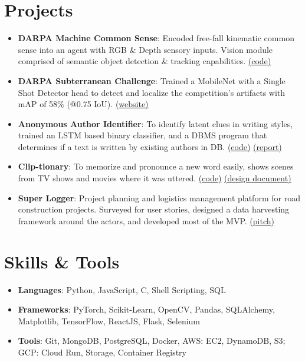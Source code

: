 \documentclass[letterpaper,11pt]{article}
\newcommand{\resumeItem}[2]{
  \item\small{
    \textbf{#1}{: #2 \vspace{-2pt}}
  }
}
\newcommand{\resumeSubItem}[2]{\resumeItem{#1}{#2}\vspace{-4pt}}
\newcommand{\resumeSubHeadingListStart}{\begin{itemize}[leftmargin=*]}
\newcommand{\resumeSubHeadingListEnd}{\end{itemize}}
\begin{document}
\section{Projects}
  \resumeSubHeadingListStart
    \resumeSubItem{DARPA Machine Common Sense}
      {Encoded free-fall kinematic common sense into an agent with RGB \& Depth sensory inputs. Vision module comprised of semantic object detection \& tracking capabilities. \textcolor{MidnightBlue}{\href{https://github.com/MCS-OSU/mcs_eval3/tree/component/gravity.dspr}{(code)}}}
    \resumeSubItem{DARPA Subterranean Challenge}
      {Trained a MobileNet with a Single Shot Detector head to detect and localize the competition's artifacts with mAP of 58\% (@0.75 IoU). \textcolor{MidnightBlue}{\href{https://www.subt-explorer.com/}{(website)}}}
    \resumeSubItem{Anonymous Author Identifier}
      {To identify latent clues in writing styles, trained an LSTM based binary classifier, and a DBMS program that determines if a text is written by existing authors in DB. \textcolor{MidnightBlue}{\href{https://github.com/RahulDamineni/anonymous_author_matcher}{(code)} \href{https://github.com/RahulDamineni/anonymous_author_matcher/blob/master/anon_author_identifier_report.pdf}{(report)}}}
    \resumeSubItem{Clip-tionary}
      {To memorize and pronounce a new word easily, shows scenes from TV shows and movies where it was uttered. \textcolor{MidnightBlue}{\href{https://github.com/RahulDamineni/tv-dict}{(code)} \href{https://github.com/RahulDamineni/tv-dict/blob/master/CS562_ProjectSketch.pdf}{(design document)}}}
    \resumeSubItem{Super Logger}
      {Project planning and logistics management platform for road construction projects. Surveyed for user stories, designed a data harvesting framework around the actors, and developed most of the MVP. \textcolor{MidnightBlue}{\href{https://drive.google.com/file/d/1H9IJ4kVDP79thjI6kPTr0LBxHkd46nlo/view?usp=sharing}{(pitch)}}}
  \resumeSubHeadingListEnd


\vspace{-5pt}
\section{Skills \& Tools}
  \resumeSubHeadingListStart
    \item{
      \textbf{Languages}{: Python, JavaScript, C, Shell Scripting, SQL}
    }
    \item{
      \textbf{Frameworks}{: PyTorch, Scikit-Learn, OpenCV, Pandas, SQLAlchemy, Matplotlib, TensorFlow, ReactJS, Flask, Selenium}
    }
    \item{
      \textbf{Tools}{: Git, MongoDB, PostgreSQL, Docker, AWS: EC2, DynamoDB, S3; GCP: Cloud Run, Storage, Container Registry}
    }
  \resumeSubHeadingListEnd
\end{document}
